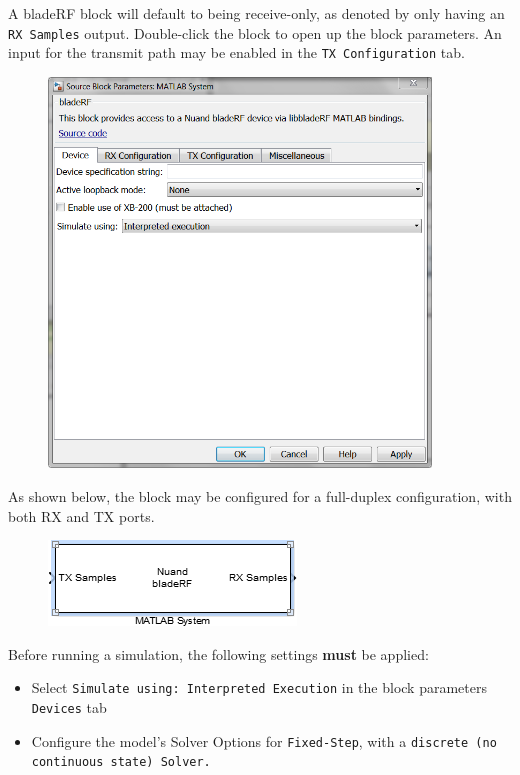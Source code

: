 {\newpage

A bladeRF block will default to being receive-only, as denoted by only having an \texttt{RX Samples} output. Double-click
the block to open up the block parameters. An input for the transmit path may be enabled in the \texttt{TX Configuration}
tab.

\begin{figure}[h]
  \centering
  \includegraphics[width=4in]{images/windows/simulink/block-properties.png}
\end{figure}

As shown below, the block may be configured for a full-duplex configuration, with both RX and TX ports.

\begin{figure}[h]
  \centering
  \includegraphics{images/windows/simulink/block.png}
\end{figure}

\newpage

Before running a simulation, the following settings \textbf{must} be applied:
\begin{itemize}
  \item{Select \texttt{Simulate using: Interpreted Execution} in the block parameters \texttt{Devices} tab}
  \item{Configure the model's Solver Options for \texttt{Fixed-Step}, with a \texttt{discrete (no continuous state) Solver.}}
\end{itemize}

}
